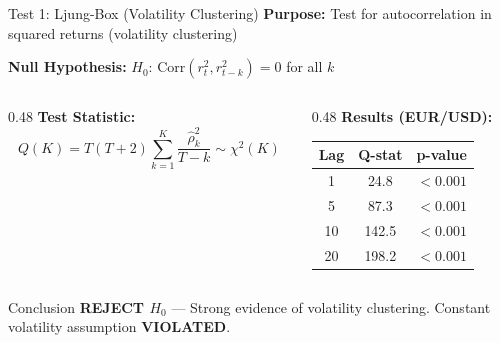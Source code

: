 \documentclass[11pt,aspectratio=169]{beamer}
\begin{document}
	\begin{frame}{Test 1: Ljung-Box (Volatility Clustering)}
		\textbf{Purpose:} Test for autocorrelation in squared returns (volatility clustering)
		
		\vspace{0.2cm}
		
		\textbf{Null Hypothesis:} $H_0$: $\text{Corr}(r_t^2, r_{t-k}^2) = 0$ for all $k$
		
		\vspace{0.2cm}
		
		\begin{columns}[T]
			\begin{column}{0.48\textwidth}
				\textbf{Test Statistic:}
				\begin{equation*}
					Q(K) = T(T+2) \sum_{k=1}^K \frac{\hat{\rho}_k^2}{T-k} \sim \chi^2(K)
				\end{equation*}
			\end{column}
			
			\begin{column}{0.48\textwidth}
				\textbf{Results (EUR/USD):}
				\scriptsize
				\begin{table}
					\begin{tabular}{|c|c|c|}
						\hline
						\textbf{Lag} & \textbf{Q-stat} & \textbf{p-value} \\
						\hline
						1 & 24.8 & $<0.001$ \\
						5 & 87.3 & $<0.001$ \\
						10 & 142.5 & $<0.001$ \\
						20 & 198.2 & $<0.001$ \\
						\hline
					\end{tabular}
				\end{table}
				\normalsize
			\end{column}
		\end{columns}
		
		\vspace{0.3cm}
		
		\begin{alertblock}{Conclusion}
			\textcolor{mufgred}{\textbf{REJECT $H_0$}} — Strong evidence of volatility clustering. Constant volatility assumption \textbf{VIOLATED}.
		\end{alertblock}
	\end{frame}
	
\end{document}
